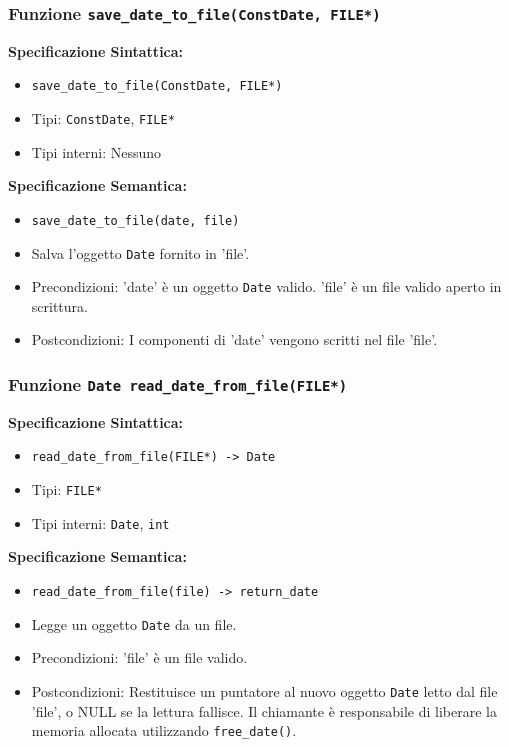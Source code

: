 \documentclass[11pt]{scrartcl} %
\begin{document}
\subsubsection{Funzione \texttt{save\_date\_to\_file(ConstDate, FILE*)}}

\textbf{Specificazione Sintattica:}
\begin{itemize}
	\item \texttt{save\_date\_to\_file(ConstDate, FILE*)}
	\item Tipi: \texttt{ConstDate}, \texttt{FILE*}
	\item Tipi interni: Nessuno
\end{itemize}

\textbf{Specificazione Semantica:}
\begin{itemize}
	\item \texttt{save\_date\_to\_file(date, file)}
	\item Salva l'oggetto \texttt{Date} fornito in 'file'.
	\item Precondizioni: 'date' è un oggetto \texttt{Date} valido. 'file' è un file valido aperto in scrittura.
	\item Postcondizioni: I componenti di 'date' vengono scritti nel file 'file'.
\end{itemize}

\subsubsection{Funzione \texttt{Date read\_date\_from\_file(FILE*)}}

\textbf{Specificazione Sintattica:}
\begin{itemize}
	\item \texttt{read\_date\_from\_file(FILE*) -> Date}
	\item Tipi: \texttt{FILE*}
	\item Tipi interni: \texttt{Date}, \texttt{int}
\end{itemize}

\textbf{Specificazione Semantica:}
\begin{itemize}
	\item \texttt{read\_date\_from\_file(file) -> return\_date}
	\item Legge un oggetto \texttt{Date} da un file.
	\item Precondizioni: 'file' è un file valido.
	\item Postcondizioni: Restituisce un puntatore al nuovo oggetto \texttt{Date} letto dal file 'file', o NULL se la lettura fallisce. Il chiamante è responsabile di liberare la memoria allocata utilizzando \texttt{free\_date()}.
\end{itemize}
\end{document}
